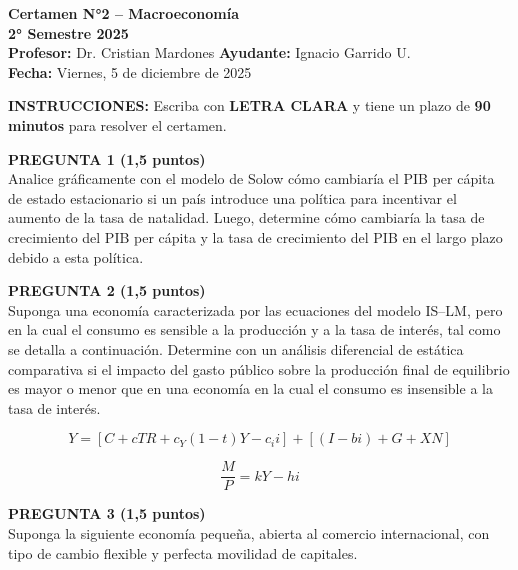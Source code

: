 \documentclass[11pt,addpoints]{article}
\begin{document}
\vspace*{0.1cm}

\begin{center}
{\Large \bfseries Certamen N°2 – Macroeconomía \\[0.25cm]}
\textbf{2° Semestre 2025}\\[0.3cm]
\textbf{Profesor:} Dr. Cristian Mardones \textbf{Ayudante:} Ignacio Garrido U.\\[0.2cm]
\textbf{Fecha:} Viernes, 5 de diciembre de 2025
\end{center}

\vspace{0.4cm}
\textbf{INSTRUCCIONES:} Escriba con \textbf{LETRA CLARA} y tiene un plazo de \textbf{90 minutos} para resolver el certamen.

\vspace{0.6cm}

\textbf{PREGUNTA 1 (1,5 puntos)}\\[0.3cm]
Analice gráficamente con el modelo de Solow cómo cambiaría el PIB per cápita de estado estacionario si un país introduce una política para incentivar el aumento de la tasa de natalidad. Luego, determine cómo cambiaría la tasa de crecimiento del PIB per cápita y la tasa de crecimiento del PIB en el largo plazo debido a esta política.

\vspace{0.8cm}

\textbf{PREGUNTA 2 (1,5 puntos)}\\[0.3cm]
Suponga una economía caracterizada por las ecuaciones del modelo IS–LM, pero en la cual el consumo es sensible a la producción y a la tasa de interés, tal como se detalla a continuación. Determine con un análisis diferencial de estática comparativa si el impacto del gasto público sobre la producción final de equilibrio es mayor o menor que en una economía en la cual el consumo es insensible a la tasa de interés.

\[
Y = [C + cTR + c_Y (1 - t)Y - c_i i] + [(I - bi) + G + XN]
\]

\[
\frac{M}{P} = kY - hi
\]

\vspace{0.8cm}

\textbf{PREGUNTA 3 (1,5 puntos)}\\[0.3cm]
Suponga la siguiente economía pequeña, abierta al comercio internacional, con tipo de cambio flexible y perfecta movilidad de capitales.
\end{document}
